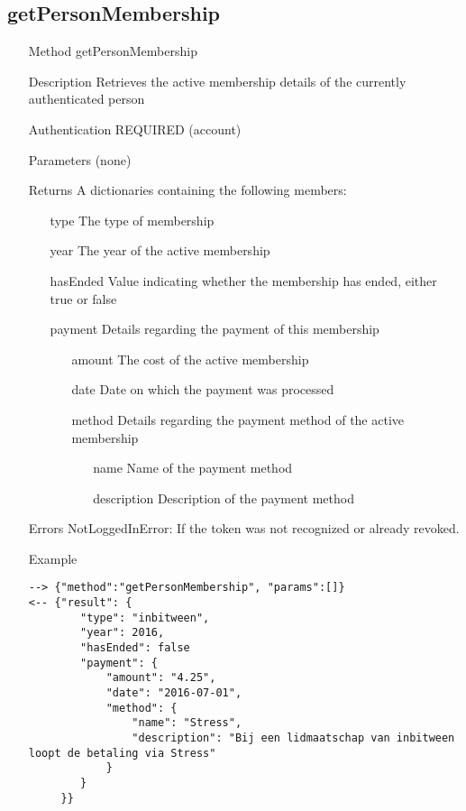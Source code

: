 \documentclass[a4paper]{scrreprt}
\begin{document}
\clearpage
\subsection{getPersonMembership}
\begin{enumerate}
\item[Method] getPersonMembership
\item[Description] Retrieves the active membership details of the currently authenticated person
\item[Authentication] REQUIRED (account)
\item[Parameters] (none)
\item[Returns] A dictionaries containing the following members:
\begin{enumerate}
	\item[type] The type of membership
    \item[year] The year of the active membership
    \item[hasEnded] Value indicating whether the membership has ended, either true or false
    \item[payment] Details regarding the payment of this membership
    \begin{enumerate}
        \item[amount] The cost of the active membership
        \item[date] Date on which the payment was processed
        \item[method] Details regarding the payment method of the active membership
        \begin{enumerate}
            \item[name] Name of the payment method
            \item[description] Description of the payment method
            \end{enumerate}
        \end{enumerate}
    \end{enumerate}
\item[Errors] NotLoggedInError: If the token was not recognized or already revoked.
\item[Example]
\begin{lstlisting}
--> {"method":"getPersonMembership", "params":[]}
<-- {"result": {
        "type": "inbitween",
        "year": 2016,
        "hasEnded": false
        "payment": {
            "amount": "4.25",
            "date": "2016-07-01",
            "method": {
                "name": "Stress",
                "description": "Bij een lidmaatschap van inbitween loopt de betaling via Stress"
            }
        }
     }}
\end{lstlisting}
\end{enumerate}
\end{document}

